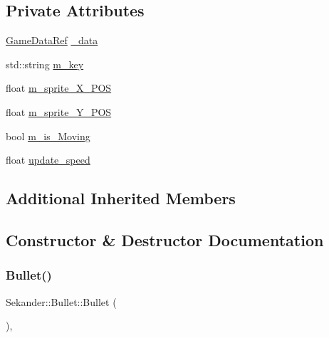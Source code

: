 \subsection*{Private Attributes}
\begin{DoxyCompactItemize}
\item 
\hyperlink{namespaceSekander_a1d69b002ba2d23020901c28f0def5e16}{Game\+Data\+Ref} \hyperlink{classSekander_1_1Bullet_a8364cf9123fa3cef559b728365e5dfbd}{\+\_\+data}
\item 
std\+::string \hyperlink{classSekander_1_1Bullet_a9bfd31dd2969cb13c030e4855ad6e941}{m\+\_\+key}
\item 
float \hyperlink{classSekander_1_1Bullet_a812362902ae2d81e34d422da1236effb}{m\+\_\+sprite\+\_\+\+X\+\_\+\+P\+OS}
\item 
float \hyperlink{classSekander_1_1Bullet_ad02929665b73be5d20513a2b2dd0aa25}{m\+\_\+sprite\+\_\+\+Y\+\_\+\+P\+OS}
\item 
bool \hyperlink{classSekander_1_1Bullet_a053f4f8f61626e60764502601db6910e}{m\+\_\+is\+\_\+\+Moving}
\item 
float \hyperlink{classSekander_1_1Bullet_a3ffffd748d6b7c0e7afd88a1c2603642}{update\+\_\+speed}
\end{DoxyCompactItemize}
\subsection*{Additional Inherited Members}


\subsection{Constructor \& Destructor Documentation}
\mbox{\label{classSekander_1_1Bullet_aa01f203963a28b68470ad288d1fd37f7}} 
\subsubsection{\texorpdfstring{Bullet()}{Bullet()}\hspace{0.1cm}{\footnotesize\ttfamily [1/2]}}
{\footnotesize\ttfamily Sekander\+::\+Bullet\+::\+Bullet (\begin{DoxyParamCaption}{ }\end{DoxyParamCaption})\hspace{0.3cm}{\ttfamily [inline]}, {\ttfamily [explicit]}}

